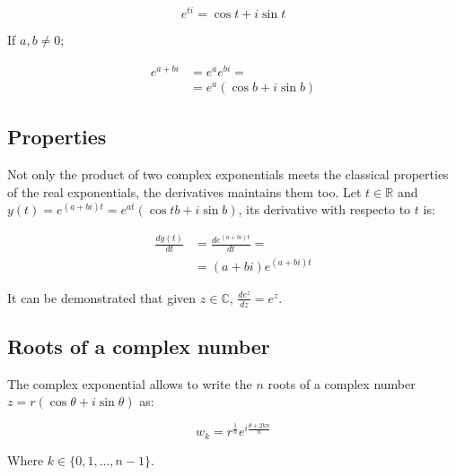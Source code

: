 $$e^{ti} = \cos t + i\sin t$$

If $a, b\neq 0$;

\begin{align*}
	e^{a+bi} &= e^ae^{bi} =\\
					 &=e^a(\cos b + i\sin b)
\end{align*}

	\subsection{Properties}
	Not only the product of two complex exponentials meets the classical properties of the real exponentials, the derivatives maintains them too.
	Let $t\in\mathbb{R}$ and $y(t) = e^{(a+bi)t} = e^{at}(\cos t b + i\sin b)$, its derivative with respecto to $t$ is:

	\begin{align*}
		\frac{dy(t)}{dt} &= \frac{de^{(a+bi)t}}{dt}=\\
										 &= (a+bi)e^{(a+bi)t}
	\end{align*}

	It can be demonstrated that given $z\in\mathbb{C}$, $\frac{de^z}{dz} = e^z$.

	\subsection{Roots of a complex number}
	The complex exponential allows to write the $n$ roots of a complex number $z = r(\cos\theta + i\sin\theta)$ as:

	$$w_k = r^\frac{1}{n}e^{i\frac{\theta+2kn}{n}}$$

	Where $k\in\{0, 1, \dots, n-1\}$.

